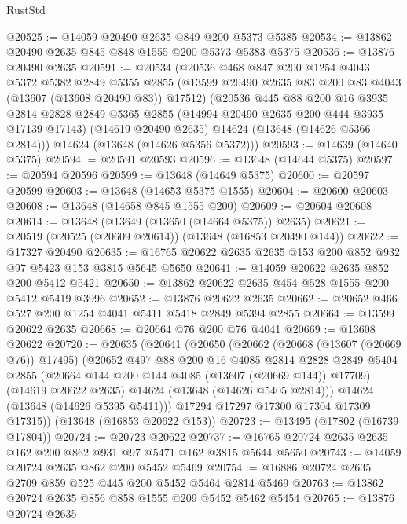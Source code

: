 \begin{lexlean}{RustStd}
\begin{coremodule}
@20525 := @14059 @20490 @2635 @849 @200 @5373 @5385
@20534 := @13862 @20490 @2635 @845 @848 @1555 @200 @5373 @5383 @5375
@20536 := @13876 @20490 @2635
@20591 := @20534
    (@20536
      @468
      @847
      @200
      @1254
      @4043
      @5372
      @5382
      @2849
      @5355
      @2855
      (@13599 @20490 @2635 @83 @200 @83 @4043 (@13607 (@13608 @20490 @83)) @17512)
      (@20536
        @445
        @88
        @200
        @16
        @3935
        @2814
        @2828
        @2849
        @5365
        @2855
        (@14994 @20490 @2635 @200 @444 @3935 @17139 @17143)
        (@14619 @20490 @2635)
        @14624
        (@13648 (@14626 @5366 @2814)))
      @14624
      (@13648 (@14626 @5356 @5372)))
@20593 := @14639 (@14640 @5375)
@20594 := @20591 @20593
@20596 := @13648 (@14644 @5375)
@20597 := @20594 @20596
@20599 := @13648 (@14649 @5375)
@20600 := @20597 @20599
@20603 := @13648 (@14653 @5375 @1555)
@20604 := @20600 @20603
@20608 := @13648 (@14658 @845 @1555 @200)
@20609 := @20604 @20608
@20614 := @13648 (@13649 (@13650 (@14664 @5375)) @2635)
@20621 := @20519 (@20525 (@20609 @20614)) (@13648 (@16853 @20490 @144))
@20622 := @17327 @20490
@20635 := @16765 @20622 @2635 @2635 @153 @200 @852 @932 @97 @5423 @153 @3815 @5645 @5650
@20641 := @14059 @20622 @2635 @852 @200 @5412 @5421
@20650 := @13862 @20622 @2635 @454 @528 @1555 @200 @5412 @5419 @3996
@20652 := @13876 @20622 @2635
@20662 := @20652 @466 @527 @200 @1254 @4041 @5411 @5418 @2849 @5394 @2855
@20664 := @13599 @20622 @2635
@20668 := @20664 @76 @200 @76 @4041
@20669 := @13608 @20622
@20720 := @20635
    (@20641
      (@20650
        (@20662
          (@20668 (@13607 (@20669 @76)) @17495)
          (@20652
            @497
            @88
            @200
            @16
            @4085
            @2814
            @2828
            @2849
            @5404
            @2855
            (@20664 @144 @200 @144 @4085 (@13607 (@20669 @144)) @17709)
            (@14619 @20622 @2635)
            @14624
            (@13648 (@14626 @5405 @2814)))
          @14624
          (@13648 (@14626 @5395 @5411)))
        @17294
        @17297
        @17300
        @17304
        @17309
        @17315))
    (@13648 (@16853 @20622 @153))
@20723 := @13495 (@17802 (@16739 @17804))
@20724 := @20723 @20622
@20737 := @16765 @20724 @2635 @2635 @162 @200 @862 @931 @97 @5471 @162 @3815 @5644 @5650
@20743 := @14059 @20724 @2635 @862 @200 @5452 @5469
@20754 := @16886 @20724 @2635 @2709 @859 @525 @445 @200 @5452 @5464 @2814 @5469
@20763 := @13862 @20724 @2635 @856 @858 @1555 @209 @5452 @5462 @5454
@20765 := @13876 @20724 @2635

\end{coremodule}
\end{lexlean}
